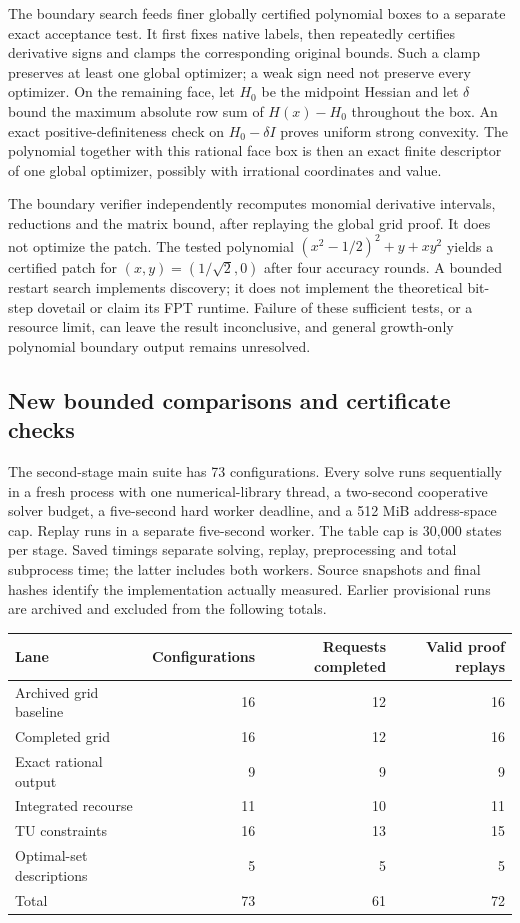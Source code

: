 The boundary search feeds finer globally certified polynomial boxes to a
separate exact acceptance test. It first fixes native labels, then
repeatedly certifies derivative signs and clamps the corresponding original
bounds. Such a clamp preserves at least one global optimizer; a weak sign
need not preserve every optimizer. On the remaining face, let $H_0$ be the
midpoint Hessian and let $\delta$ bound the maximum absolute row sum of
$H(x)-H_0$ throughout the box. An exact positive-definiteness check on
$H_0-\delta I$ proves uniform strong convexity. The polynomial together
with this rational face box is then an exact finite descriptor of one
global optimizer, possibly with irrational coordinates and value.

The boundary verifier independently recomputes monomial derivative
intervals, reductions and the matrix bound, after replaying the global
grid proof. It does not optimize the patch. The tested polynomial
$(x^2-1/2)^2+y+xy^2$ yields a certified patch for
$(x,y)=(1/\sqrt2,0)$ after four accuracy rounds. A bounded restart search
implements discovery; it does not implement the theoretical bit-step
dovetail or claim its FPT runtime. Failure of these sufficient tests, or a resource limit, can leave the
result inconclusive, and general growth-only polynomial boundary
output remains unresolved.

\subsection{New bounded comparisons and certificate checks}
The second-stage main suite has 73 configurations. Every solve runs
sequentially in a fresh process with one numerical-library thread, a
two-second cooperative solver budget, a five-second hard worker deadline,
and a 512 MiB address-space cap. Replay runs in a separate five-second
worker. The table cap is 30,000 states per stage. Saved timings separate
solving, replay, preprocessing and total subprocess time; the latter
includes both workers. Source snapshots and final hashes identify the
implementation actually measured. Earlier provisional runs are archived
and excluded from the following totals.

\begin{center}
\begin{tabular}{lrrr}
\toprule
Lane & Configurations & Requests completed & Valid proof replays\\
\midrule
Archived grid baseline & 16 & 12 & 16\\
Completed grid & 16 & 12 & 16\\
Exact rational output & 9 & 9 & 9\\
Integrated recourse & 11 & 10 & 11\\
TU constraints & 16 & 13 & 15\\
Optimal-set descriptions & 5 & 5 & 5\\
\midrule
Total & 73 & 61 & 72\\
\bottomrule
\end{tabular}
\end{center}


